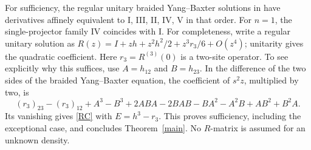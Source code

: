 \documentclass[11pt]{article}
\begin{document}
For sufficiency, the regular unitary braided Yang--Baxter solutions in \cite[arXiv version, Eqs.~(12)--(15), (18)]{Bytsko1} have derivatives affinely equivalent to I, III, II, IV, V in that order. For $n=1$, the single-projector family IV coincides with I. For completeness, write a regular unitary solution as $R(z)=I+zh+z^2h^2/2+z^3r_3/6+O(z^4)$; unitarity gives the quadratic coefficient. Here $r_3=R^{(3)}(0)$ is a two-site operator. To see explicitly why this suffices, use $A=h_{12}$ and $B=h_{23}$. In the difference of the two sides of the braided Yang--Baxter equation, the coefficient of $s^2z$, multiplied by two, is
\[
 (r_3)_{23}-(r_3)_{12}+A^3-B^3
 +2ABA-2BAB-BA^2-A^2B+AB^2+B^2A.
\]
Its vanishing gives \eqref{RC} with $E=h^3-r_3$. This proves sufficiency, including the exceptional case, and concludes Theorem~\ref{main}. No $R$-matrix is assumed for an unknown density.

\appendix
\end{document}
